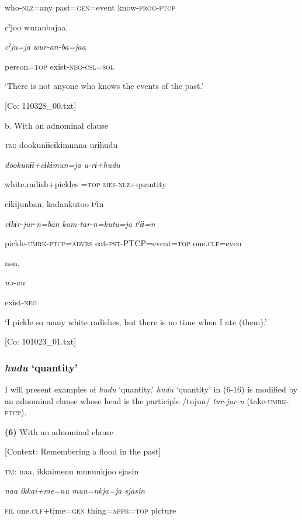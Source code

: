       who-\textsc{nlz}=any  past=\textsc{gen}=event  know-\textsc{prog}-\textsc{ptcp}

      cˀjoo  wuranbajaa.

      \textit{cˀju=ja}  \textit{wur-an-ba=jaa}

      person=\textsc{top}  exist-\textsc{neg}-\textsc{csl}=\textsc{sol}

      ‘There is not anyone who knows the events of the past.’

      [Co: 110328\_00.txt]

  b.  With an adnominal clause

    \textsc{tm}:  dookunɨɨcɨkɨmunna  urɨhudu

      \textit{dookunɨɨ+cɨkɨmun=ja}  \textit{u-rɨ+hudu}

      white.radish+pickles =\textsc{top}  \textsc{mes}-\textsc{nlz}+quantity

      cɨkɨjunban,  kadankutoo  tˀɨn

      \textit{cɨkɨr-jur-n=ban}  \textit{kam-tar-n=kutu=ja}  \textit{tˀɨɨ=n}

      pickle-\textsc{umrk}-\textsc{ptcp}=\textsc{advrs}  eat-\textsc{pst}-PTCP=event=\textsc{top}  one.\textsc{clf}=even

      nən.

      \textit{nə-an}

      exist-\textsc{neg}

      ‘I pickle so many white radishes, but there is no time when I ate (them).’

      [Co: 101023\_01.txt]

\subsubsection{\textit{hudu} ‘quantity’}

I will present examples of \textit{hudu} ‘quantity.’ \textit{hudu} ‘quantity’ in (6-16) is modified by an adnominal clause whose head is the participle /tujun/ \textit{tur-jur-n} (take-\textsc{umrk}-\textsc{ptcp}).

\textbf{(6)}  With an adnominal clause

  [Context: Remembering a flood in the past]

  \textsc{tm}:  naa,  {\textbar}ikkaime{\textbar}nu  mununkjoo  sjasin

    \textit{naa}  \textit{ikkai+me=nu}  \textit{mun=nkja=ja}  \textit{sjasin}

    \textsc{fil}  one.\textsc{clf}+time=\textsc{gen}  thing=\textsc{appr}=\textsc{top}  picture

